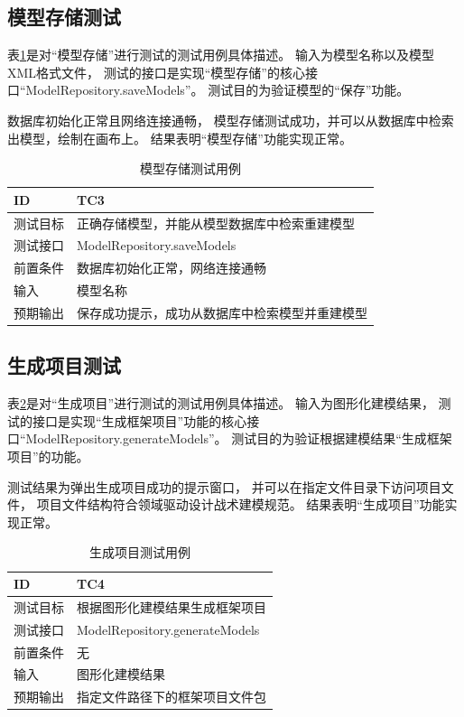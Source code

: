 \subsection{模型存储测试}

表\ref{testcase3}是对“模型存储”进行测试的测试用例具体描述。
输入为模型名称以及模型XML格式文件，
测试的接口是实现“模型存储”的核心接口“ModelRepository.saveModels”。
测试目的为验证模型的“保存”功能。

数据库初始化正常且网络连接通畅，
模型存储测试成功，并可以从数据库中检索出模型，绘制在画布上。
结果表明“模型存储”功能实现正常。

{\footnotesize
\begin{longtable}[h]{m{80pt}|m{305pt}}
    \caption[模型存储测试用例]{模型存储测试用例} \label{testcase3} \\
        \hline
        ID&TC3\\
        \hline
        测试目标&正确存储模型，并能从模型数据库中检索重建模型\\
        \hline
        测试接口&ModelRepository.saveModels\\
        \hline
        前置条件&数据库初始化正常，网络连接通畅\\
        \hline
        输入& 模型名称\\
        \hline
        预期输出& 保存成功提示，成功从数据库中检索模型并重建模型\\
        \hline 

\end{longtable} 
}

\subsection{生成项目测试}

表\ref{testcase4}是对“生成项目”进行测试的测试用例具体描述。
输入为图形化建模结果，
测试的接口是实现“生成框架项目”功能的核心接口“ModelRepository.generateModels”。
测试目的为验证根据建模结果“生成框架项目”的功能。

测试结果为弹出生成项目成功的提示窗口，
并可以在指定文件目录下访问项目文件，
项目文件结构符合领域驱动设计战术建模规范。
结果表明“生成项目”功能实现正常。

{\footnotesize
\begin{longtable}[h]{m{80pt}|m{305pt}}
    \caption[生成项目测试用例]{生成项目测试用例} \label{testcase4} \\
        \hline  
        ID&TC4\\
        \hline
        测试目标&根据图形化建模结果生成框架项目\\
        \hline
        测试接口&ModelRepository.generateModels\\
        \hline
        前置条件&无\\
        \hline
        输入& 图形化建模结果\\
        \hline
        预期输出& 指定文件路径下的框架项目文件包\\
        \hline
\end{longtable} 
}


